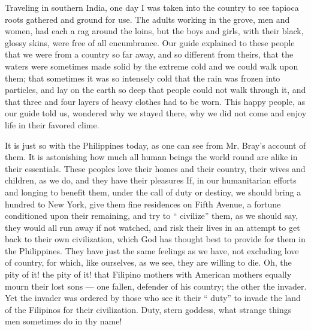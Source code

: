 \documentclass[11pt,openany]{book}
\begin{document}
Traveling in southern India, one day I was taken into the country to see tapioca roots gathered and ground for use. The adults working in the grove, men and women, had each a rag around the loins, but the boys and girls, with their black, glossy skins, were free of all encumbrance. Our guide explained to these people that we were from a country so far away, and so different from theirs, that the waters were sometimes made solid by the extreme cold and we could walk upon them; that sometimes it was so intensely cold that the rain was frozen into particles, and lay on the earth so deep that people could not walk through it, and that three and four layers of heavy clothes had to be worn. This happy people, as our guide told us, wondered why we stayed there, why we did not come and enjoy life in their favored clime.

It is just so with the Philippines today, as one can see from Mr. Bray's account of them. It is astonishing how much all human beings the world round are alike in their essentials. These peoples love their homes and their country, their wives and children, as we do, and they have their pleasures If, in our humanitarian efforts and longing to benefit them, under the call of duty or destiny, we should bring a hundred to New York, give them fine residences on Fifth Avenue, a fortune conditioned upon their remaining, and try to `` civilize'' them, as we should say, they would all run away if not watched, and risk their lives in an attempt to get back to their own civilization, which God has thought best to provide for them in the Philippines. They have just the same feelings as we have, not excluding love of country, for which, like ourselves, as we see, they are willing to die. Oh, the pity of it! the pity of it! that Filipino mothers with American mothers equally mourn their lost sons --- one fallen, defender of his country; the other the invader. Yet the invader was ordered by those who see it their `` duty'' to invade the land of the Filipinos for their civilization. Duty, stern goddess, what strange things men sometimes do in thy name!
\end{document}
